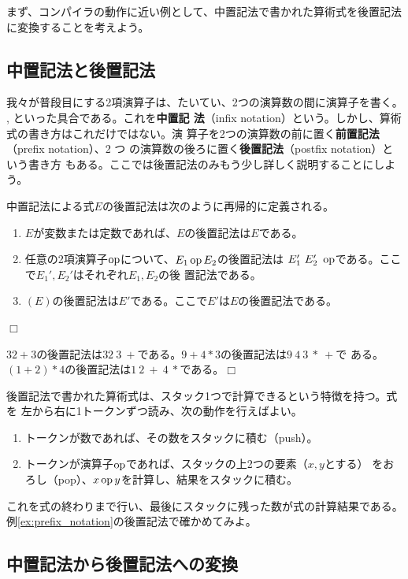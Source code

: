 まず、コンパイラの動作に近い例として、中置記法で書かれた算術式を後置記法
に変換することを考えよう。

\subsection{中置記法と後置記法}

我々が普段目にする2項演算子は、たいてい、2つの演算数の間に演算子を書く。
, といった具合である。これを{\bfseries 中置記
法}（infix notation）という。しかし、算術式の書き方はこれだけではない。演
算子を2つの演算数の前に置く{\bfseries 前置記法}（prefix notation）、2 つ
の演算数の後ろに置く{\bfseries 後置記法}（postfix notation）という書き方
もある。ここでは後置記法のみもう少し詳しく説明することにしよう。

\begin{definition}
 中置記法による式$E$の後置記法は次のように再帰的に定義される。
 \begin{enumerate}
  \item $E$が変数または定数であれば、$E$の後置記法は$E$である。
  \item 任意の2項演算子$\operatorname{op}$について、$E_1 \operatorname{op} E_2$の後置記法は
	$E_1'~E_2'~\operatorname{op}$である。ここで$E_1', E_2'$はそれぞれ$E_1, E_2$の後
	置記法である。
  \item $(E)$の後置記法は$E'$である。ここで$E'$は$E$の後置記法である。
 \end{enumerate}$\Box$
\end{definition}

\begin{example}
 $32 + 3$の後置記法は$32~3~+$である。$9 + 4 * 3$の後置記法は$9~4~3~*~+$で
 ある。$(1+2)*4$の後置記法は$1~2~+~4~*$である。$\Box$
 \label{ex:prefix_notation}
\end{example}

後置記法で書かれた算術式は、スタック1つで計算できるという特徴を持つ。式を
左から右に1トークンずつ読み、次の動作を行えばよい。
\begin{enumerate}
 \item トークンが数であれば、その数をスタックに積む（push）。
 \item トークンが演算子$\operatorname{op}$であれば、スタックの上2つの要素（$x, y$とする）
       をおろし（pop）、$x \operatorname{op} y$を計算し、結果をスタックに積む。
\end{enumerate}
これを式の終わりまで行い、最後にスタックに残った数が式の計算結果である。
例\ref{ex:prefix_notation}の後置記法で確かめてみよ。

\subsection{中置記法から後置記法への変換}

